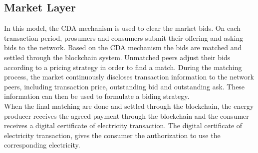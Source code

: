 \subsection{Market Layer}
In this model, the CDA mechanism is used to clear the market bids. On each transaction period, prosumers and consumers submit their offering and asking bids to the network.
Based on the CDA mechanism the bids are matched and settled through the blockchain system. Unmatched peers adjust their bids according to a pricing strategy in order to find
a match. During the matching process, the market continuously discloses transaction information to the network peers, including transaction price, outstanding
bid and outstanding ask. These information can then be used to formulate a biding strategy.\\
When the final matching are done and settled through the blockchain, the energy producer receives the agreed payment through the blockchain and the consumer receives a digital
certificate of electricity transaction. The digital certificate of electricity transaction, gives the consumer the authorization to use the corresponding electricity.
\cite{wang2017novel}

